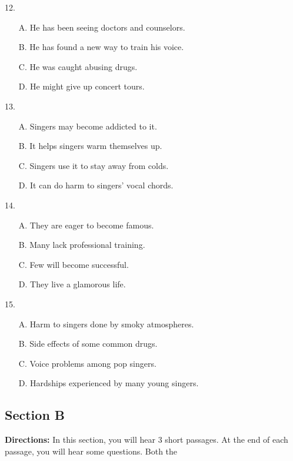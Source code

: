 \documentclass[UTF8,11pt]{ctexart}
\begin{document}
12.


\begin{itemize}[leftmargin=2em,itemsep=.2em,topsep=.4em]\item[A.] He has been seeing doctors and counselors.
\item[B.] He has found a new way to train his voice.
\item[C.] He was caught abusing drugs.
\item[D.] He might give up concert tours.
\end{itemize}

13.


\begin{itemize}[leftmargin=2em,itemsep=.2em,topsep=.4em]\item[A.] Singers may become addicted to it.
\item[B.] It helps singers warm themselves up.
\item[C.] Singers use it to stay away from colds.
\item[D.] It can do harm to singers’ vocal chords.
\end{itemize}

14.


\begin{itemize}[leftmargin=2em,itemsep=.2em,topsep=.4em]\item[A.] They are eager to become famous.
\item[B.] Many lack professional training.
\item[C.] Few will become successful.
\item[D.] They live a glamorous life.
\end{itemize}

15.


\begin{itemize}[leftmargin=2em,itemsep=.2em,topsep=.4em]\item[A.] Harm to singers done by smoky atmospheres.
\item[B.] Side effects of some common drugs.
\item[C.] Voice problems among pop singers.
\item[D.] Hardships experienced by many young singers.
\end{itemize}

\subsection*{\textbf{Section B}}


\textbf{Directions:} In this section, you will hear 3 short passages. At the end of each passage, you will hear some questions. Both the
\end{document}
